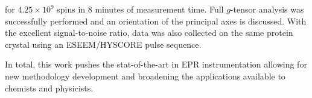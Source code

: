for $4.25 \times 10^9$ spins in 8 minutes of measurement time. Full $g$-tensor analysis was successfully performed and an orientation of the principal axes is discussed. With the excellent signal-to-noise ratio, data was also collected on the same protein crystal using an ESEEM/HYSCORE pulse sequence.

In total, this work pushes the stat-of-the-art in EPR instrumentation allowing for new methodology development and broadening the applications available to chemists and physicists.